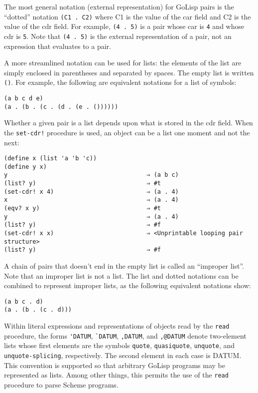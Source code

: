 \documentclass{article}
\begin{document}
The most general notation (external representation) for GoLisp pairs is the ``dotted''
notation \verb|(C1 . C2)| where C1 is the value of the car field and C2 is the value of the
cdr field. For example, \verb|(4 . 5)| is a pair whose car is \verb|4| and whose cdr is
\verb|5|. Note that \verb|(4 . 5)| is the external representation of a pair, not an
expression that evaluates to a pair.

A more streamlined notation can be used for lists: the elements of the list are simply
enclosed in parentheses and separated by spaces. The empty list is written \verb|()|. For
example, the following are equivalent notations for a list of symbols:

\begin{verbatim}
(a b c d e)
(a . (b . (c . (d . (e . ())))))
\end{verbatim}

Whether a given pair is a list depends upon what is stored in the cdr field. When the
\verb|set-cdr!| procedure is used, an object can be a list one moment and not the next:

\begin{verbatim}
(define x (list 'a 'b 'c))
(define y x)
y                                       ⇒ (a b c)
(list? y)                               ⇒ #t
(set-cdr! x 4)                          ⇒ (a . 4)
x                                       ⇒ (a . 4)
(eqv? x y)                              ⇒ #t
y                                       ⇒ (a . 4)
(list? y)                               ⇒ #f
(set-cdr! x x)                          ⇒ <Unprintable looping pair structure>
(list? y)                               ⇒ #f
\end{verbatim}

A chain of pairs that doesn't end in the empty list is called an ``improper list''. Note that
an improper list is not a list. The list and dotted notations can be combined to represent
improper lists, as the following equivalent notations show:

\begin{verbatim}
(a b c . d)
(a . (b . (c . d)))
\end{verbatim}

Within literal expressions and representations of objects read by the \verb|read| procedure,
the forms \verb|'DATUM|, \verb|`DATUM|, \verb|,DATUM|, and \verb|,@DATUM| denote two-element lists
whose first elements are the symbols \verb|quote|, \verb|quasiquote|, \verb|unquote|,
and \verb|unquote-splicing|, respectively. The second element in each case is DATUM. This
convention is supported so that arbitrary GoLisp programs may be represented as lists. Among
other things, this permits the use of the \verb|read| procedure to parse Scheme programs.
\end{document}
